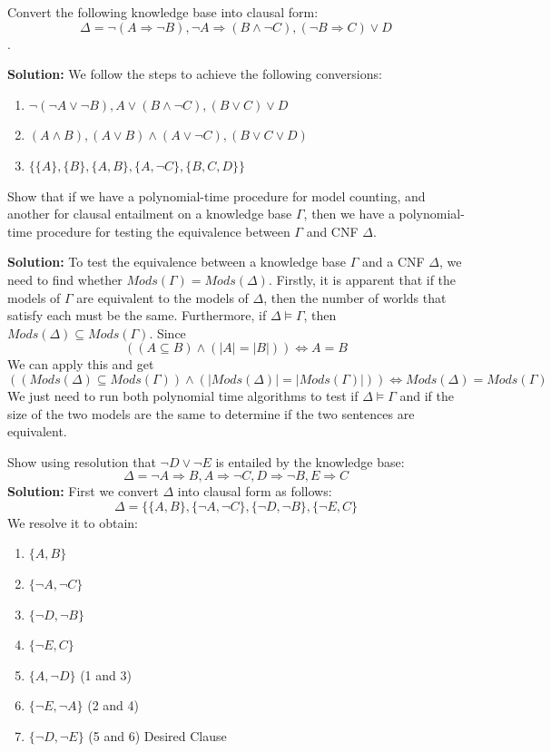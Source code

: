 \documentclass[11pt]{exam}
\begin{document}
\begin{questions}
\question[8] Convert the following knowledge base into clausal form:
$$\Delta = \lnot (A \Rightarrow\lnot B), \lnot A \Rightarrow (B \land \lnot C), (\lnot B \Rightarrow C) \lor D$$.

\textbf{Solution:} We follow the steps to achieve the following conversions:
\begin{enumerate}
\item $\lnot (\lnot A \lor \lnot B), A \lor (B \land \lnot C), (B \lor C) \lor D$
\item $(A \land B), (A \lor B) \land (A \lor \lnot C), (B \lor C \lor D)$
\item $\{\{A\}, \{B\}, \{A,B\}, \{A, \lnot C\}, \{B,C,D\}\}$
\end{enumerate}
\vspace{1em}

\question[8] Show that if we have a polynomial-time procedure for model counting, and another for clausal entailment on a knowledge base $\Gamma$, then we have a polynomial-time procedure for testing the equivalence between $\Gamma$ and CNF $\Delta$.
\vspace{1em}

\textbf{Solution:} To test the equivalence between a knowledge base $\Gamma$ and a CNF $\Delta$, we need to find whether $Mods(\Gamma) = Mods(\Delta)$. Firstly, it is apparent that if the models of $\Gamma$ are equivalent to the models of $\Delta$, then the number of worlds that satisfy each must be the same. Furthermore, if $\Delta \models \Gamma$, then $Mods(\Delta) \subseteq Mods(\Gamma)$. Since
$$((A \subseteq B) \land (\lvert A \rvert = \lvert B \rvert))\iff A = B$$
We can apply this and get
$$((Mods(\Delta) \subseteq Mods(\Gamma)) \land (\lvert Mods(\Delta)\rvert = \lvert Mods(\Gamma) \rvert)) \iff Mods(\Delta) = Mods(\Gamma)$$
We just need to run both polynomial time algorithms to test if $\Delta \models \Gamma$ and if the size of the two models are the same to determine if the two sentences are equivalent.
\vspace{1em}

\question[10] Show using resolution that $\lnot D \lor \lnot E$ is entailed by the knowledge base:
$$\Delta = \lnot A \Rightarrow B, A \Rightarrow \lnot C, D \Rightarrow \lnot B, E \Rightarrow C$$
\textbf{Solution:} First we convert $\Delta$ into clausal form as follows:
$$\Delta = \{\{A,B\}, \{\lnot A, \lnot C\}, \{\lnot D, \lnot B\},\{\lnot E, C\}$$
We resolve it to obtain:
\begin{enumerate}
    \item $\{A,B\}$
    \item $\{\lnot A, \lnot C\}$
    \item $\{\lnot D, \lnot B\}$
    \item $\{\lnot E, C\}$
    \item $\{A, \lnot D\}$ (1 and 3)
    \item $\{\lnot E, \lnot A\}$ (2 and 4)
    \item $\{\lnot D, \lnot E\}$ (5 and 6) Desired Clause
\end{enumerate}


\end{questions}
\end{document}
